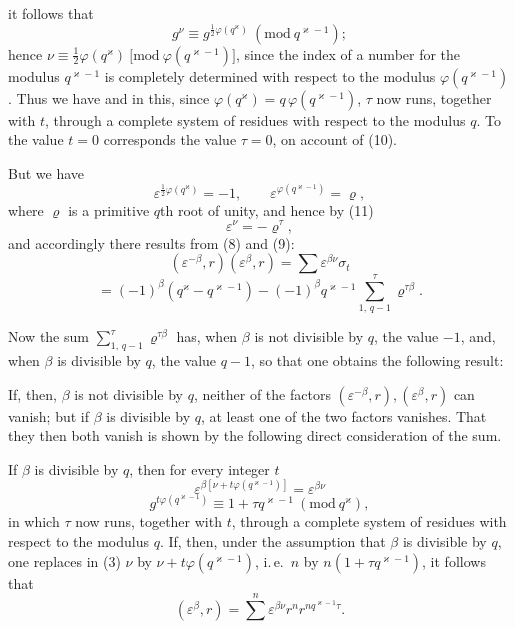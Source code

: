 it follows that
\[
g^\nu \equiv g^{\frac{1}{2}\varphi(q^\varkappa)} \ (\mathrm{mod}\ q^{\varkappa-1});
\]
hence $\nu \equiv \tfrac{1}{2}\varphi(q^\varkappa)\ \bigl[\mathrm{mod}\ \varphi(q^{\varkappa-1})\bigr]$, since the index of a number for the modulus $q^{\varkappa-1}$ is completely determined with respect to the modulus $\varphi(q^{\varkappa-1})$. Thus we have
and in this, since $\varphi(q^\varkappa) = q\,\varphi(q^{\varkappa-1})$, $\tau$ now runs, together with $t$, through a complete system of residues with respect to the modulus $q$. To the value $t=0$ corresponds the value $\tau=0$, on account of (10).

But we have
\[
\varepsilon^{\frac{1}{2}\varphi(q^\varkappa)} = -1, \qquad \varepsilon^{\varphi(q^{\varkappa-1})} = \varrho,
\]
where $\varrho$ is a primitive $q$th root of unity, and hence by (11)
\[
\varepsilon^\nu = -\varrho^\tau,
\]
and accordingly there results from (8) and (9):
\[
(\varepsilon^{-\beta}, r)(\varepsilon^{\beta}, r) = \sum \varepsilon^{\beta\nu}\sigma_t
\]
\[
= (-1)^\beta (q^\varkappa - q^{\varkappa-1}) - (-1)^\beta q^{\varkappa-1} \sum_{1,\,q-1}^{\tau} \varrho^{\tau\beta}.
\]

Now the sum $\sum\limits_{1,\,q-1}^{\tau} \varrho^{\tau\beta}$ has, when $\beta$ is not divisible by $q$, the value $-1$, and, when $\beta$ is divisible by $q$, the value $q-1$, so that one obtains the following result:

If, then, $\beta$ is not divisible by $q$, neither of the factors $(\varepsilon^{-\beta}, r), (\varepsilon^{\beta}, r)$ can vanish; but if $\beta$ is divisible by $q$, at least one of the two factors vanishes. That they then both vanish is shown by the following direct consideration of the sum.

If $\beta$ is divisible by $q$, then for every integer $t$
\[
\varepsilon^{\beta[\nu + t\varphi(q^{\varkappa-1})]} = \varepsilon^{\beta\nu}
\]
\[
g^{t\varphi(q^{\varkappa-1})} \equiv 1 + \tau q^{\varkappa-1}\ (\mathrm{mod}\ q^\varkappa),
\]
in which $\tau$ now runs, together with $t$, through a complete system of residues with respect to the modulus $q$. If, then, under the assumption that $\beta$ is divisible by $q$, one replaces in (3) $\nu$ by $\nu + t\varphi(q^{\varkappa-1})$, i.\,e.\ $n$ by $n(1+\tau q^{\varkappa-1})$, it follows that
\[
(\varepsilon^\beta, r) = \sum^{n} \varepsilon^{\beta\nu} r^n r^{n q^{\varkappa-1}\tau}.
\]
